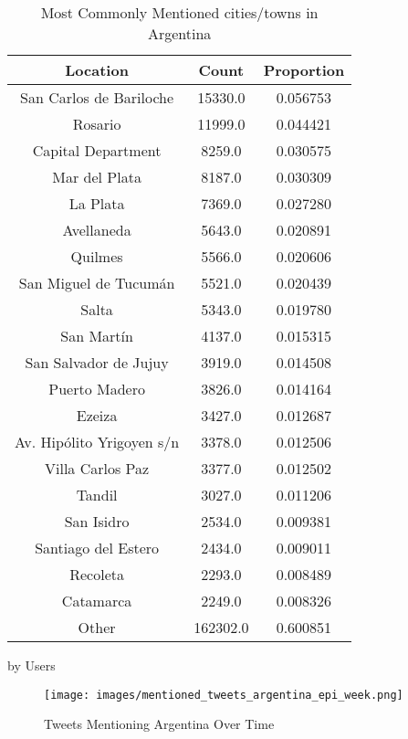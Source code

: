 \begin{table}
\begin{subtable}[c]{0.5\textwidth}
\centering
\begin{tabular}{|c|c|c|}
\hline
    \textbf{Location} & \textbf{Count} & \textbf{Proportion} \\
    \hline
    San Carlos de Bariloche & 15330.0 & 0.056753 \\
    Rosario & 11999.0 & 0.044421 \\
    Capital Department & 8259.0 & 0.030575 \\
    Mar del Plata & 8187.0 & 0.030309 \\
    La Plata & 7369.0 & 0.027280 \\
    Avellaneda & 5643.0 & 0.020891 \\
    Quilmes & 5566.0 & 0.020606 \\
    San Miguel de Tucumán & 5521.0 & 0.020439 \\
    Salta & 5343.0 & 0.019780 \\
    San Martín & 4137.0 & 0.015315 \\
    San Salvador de Jujuy & 3919.0 & 0.014508 \\
    Puerto Madero & 3826.0 & 0.014164 \\
    Ezeiza & 3427.0 & 0.012687 \\
    Av. Hipólito Yrigoyen s/n & 3378.0 & 0.012506 \\
    Villa Carlos Paz & 3377.0 & 0.012502 \\
    Tandil & 3027.0 & 0.011206 \\
    San Isidro & 2534.0 & 0.009381 \\
    Santiago del Estero & 2434.0 & 0.009011 \\
    Recoleta & 2293.0 & 0.008489 \\
    Catamarca & 2249.0 & 0.008326 \\
    Other & 162302.0 & 0.600851 \\
    \hline
    \end{tabular}
\caption{by Users}
\end{subtable}
\caption{Most Commonly Mentioned cities/towns in Argentina}
\label{table:mentioned-argentina}
\end{table}

\begin{figure}[H]
    \centering
    \texttt{[image: images/mentioned\_tweets\_argentina\_epi\_week.png]}
    
    \caption{Tweets Mentioning Argentina Over Time}
    \label{fig:mentioned-tweets-argentina-epi-week}
\end{figure}

